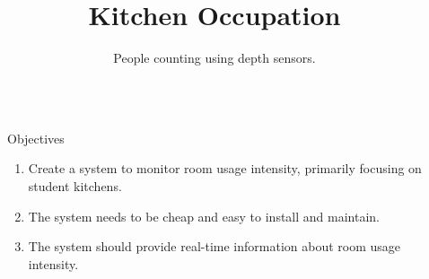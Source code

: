 \documentclass[final,hyperref={pdfpagelabels=false}]{beamer}
\title{\huge Kitchen Occupation} %
\author{People counting using depth sensors.} %
\institute{Department of Electrical Engineering, Linköping University} %
\begin{document}

\begin{frame}[t] %

\vspace*{-0.0072\textheight} %

\begin{columns}[t] %

\begin{column}{.025\textwidth}\end{column} %

\begin{column}{.465\textwidth} %


\begin{block}{Objectives}

\begin{enumerate}
\item Create a system to monitor room usage intensity, primarily focusing on student kitchens.
\item The system needs to be cheap and easy to install and maintain.
\item The system should provide real-time information about room usage intensity.
\end{enumerate}

\end{block}

            
%


\end{column}
\end{columns}
\end{frame}
\end{document}
